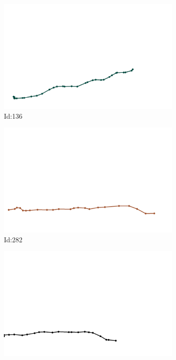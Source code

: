 \documentclass[12pt,twoside]{report}
\begin{document}
\begin{figure}
\centering
\begin{subfigure}[b]{0.20\textwidth}
\centering
\includegraphics[width=\textwidth]{../../trajectories/136.png}
\caption{Id:136}
\end{subfigure}
\begin{subfigure}[b]{0.20\textwidth}
\centering
\includegraphics[width=\textwidth]{../../trajectories/282.png}
\caption{Id:282}
\end{subfigure}
\begin{subfigure}[b]{0.20\textwidth}
\centering
\includegraphics[width=\textwidth]{../../trajectories/490.png}

\end{subfigure}
\end{figure}
\end{document}
